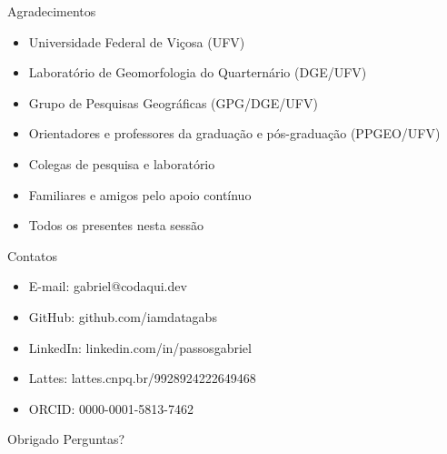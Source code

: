 \documentclass{beamer}
\begin{document}
\begin{frame}{Agradecimentos}
\begin{itemize}
    \item Universidade Federal de Viçosa (UFV)
    \item Laboratório de Geomorfologia do Quarternário (DGE/UFV)
    \item Grupo de Pesquisas Geográficas (GPG/DGE/UFV)
    \item Orientadores e professores da graduação e pós-graduação (PPGEO/UFV)
    \item Colegas de pesquisa e laboratório
    \item Familiares e amigos pelo apoio contínuo
    \item Todos os presentes nesta sessão
\end{itemize}
\end{frame}

\begin{frame}{Contatos}
\begin{itemize}
    \item E-mail: gabriel@codaqui.dev
    \item GitHub: github.com/iamdatagabs
    \item LinkedIn: linkedin.com/in/passosgabriel
    \item Lattes: lattes.cnpq.br/9928924222649468
    \item ORCID: 0000-0001-5813-7462
\end{itemize}
\end{frame}

\begin{frame}{Obrigado}
\centering
Perguntas?
\end{frame}
\end{document}

